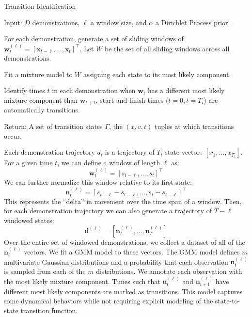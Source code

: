 \begin{algorithm}[t]
\caption{Transition Identification \label{ialgotext}}
\begin{algorithmic}[1]
\State \textsf{Input: } $D$ demonstrations, $\ell$ a window size, and $\alpha$ a Dirichlet Process prior.

\State For each demonstration, generate a set of sliding windows of $\mathbf{w}^{(\ell)}_t = [\mathbf{x}_{t-\ell},...,\mathbf{x}_{t}]^\intercal$. Let $W$ be the set of all sliding windows across all demonstrations.

\State Fit a mixture model to $W$ assigning each state to its most likely component. 

\State Identify times $t$ in each demonstration when $\mathbf{w}_t$ has a different most likely mixture component than $\mathbf{w}_{t+1}$, start and finish times ($t=0,t=T_i$) are automatically transitions. 

\State \textsf{Return: } A set of transition states $\Gamma$, the $(x,v, t)$ tuples at which transitions occur.

\end{algorithmic}

\end{algorithm}

Each demonstration trajectory $d_i$ is a trajectory of $T_i$ state-vectors $[x_1,...,x_{T_i}]$.
For a given time $t$, we can define a window of length $\ell$ as:
\[
\mathbf{w}^{(\ell)}_t = [s_{t-\ell},...,s_{t}]^\intercal
\]
We can further normalize this window relative to its first state:
\[
\mathbf{n}^{(\ell)}_t = [s_{t-\ell}-s_{t-\ell},...,s_{t}-s_{t-\ell}]^\intercal
\]
This represents the ``delta'' in movement over the time span of a window.
Then, for each demonstration trajectory we can also generate a trajectory of $T - \ell$ windowed states:
\[
\mathbf{d}^{(\ell)} = [\mathbf{n}^{(\ell)}_\ell,...,\mathbf{n}^{(\ell)}_{T}]
\]
Over the entire set of windowed demonstrations, we collect a dataset of all of the $\mathbf{n}^{(\ell)}_t$ vectors.
We fit a GMM model to these vectors.
The GMM model defines $m$ multivariate Gaussian distributions and a probability that each observation $\mathbf{n}^{(\ell)}_t$ is sampled from each of the $m$ distributions.
We annotate each observation with the most likely mixture component.
Times such that $\mathbf{n}^{(\ell)}_t$ and $\mathbf{n}^{(\ell)}_{t+1}$ have different most likely components are marked as transitions.
This model captures some dynamical behaviors while not requiring explicit modeling of the state-to-state transition function.


